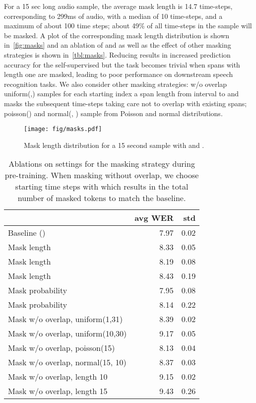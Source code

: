 \documentclass{article}
\begin{document}
For a 15 sec long audio sample, the average mask length is 14.7 time-steps, corresponding to 299ms of audio, with a median of 10 time-steps, and a maximum of about 100 time steps; about 49\% of all time-steps in the sample will be masked. 
A plot of the corresponding mask length distribution is shown in~\autoref{fig:masks} and an ablation of  and  as well as the effect of other masking strategies is shown in~\autoref{tbl:masks}. 
Reducing  results in increased prediction accuracy for the self-supervised but the task becomes trivial when spans with length one are masked, leading to poor performance on downstream speech recognition tasks.
We also consider other masking strategies: w/o overlap uniform(,) samples for each starting index a span length  from interval  to  and masks the subsequent  time-steps taking care not to overlap with existing spans;
poisson() and normal(, ) sample  from Poisson and normal distributions.

\begin{figure}[h]
\centering
\texttt{[image: fig/masks.pdf]}
\caption{Mask length distribution for a 15 second sample with  and .
}
\label{fig:masks}
\end{figure}

\begin{table}[h]
\caption{Ablations on settings for the masking strategy during pre-training. 
When masking without overlap, we choose starting time steps with  which results in the total number of masked tokens to match the baseline.
}
\label{tbl:masks}
\centering
\begin{tabular}{lrr}
\toprule
{} & avg WER &  std \\
\midrule
Baseline () & 7.97 & 0.02 \\
\midrule
Mask length  & 8.33 & 0.05 \\
Mask length  & 8.19 & 0.08 \\
Mask length  & 8.43 & 0.19 \\
\midrule
Mask probability  & 7.95 & 0.08 \\
Mask probability  & 8.14 & 0.22 \\
\midrule
Mask w/o overlap, uniform(1,31) & 8.39 & 0.02 \\
Mask w/o overlap, uniform(10,30) & 9.17 & 0.05 \\
Mask w/o overlap, poisson(15) & 8.13 & 0.04 \\
Mask w/o overlap, normal(15, 10) & 8.37 & 0.03 \\
Mask w/o overlap, length 10 & 9.15 & 0.02 \\
Mask w/o overlap, length 15 & 9.43 & 0.26 \\
\bottomrule
\end{tabular}
\end{table}
\end{document}
